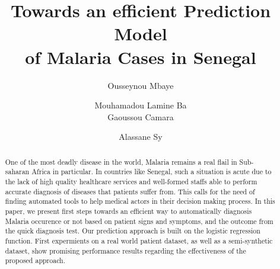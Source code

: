 \documentclass[runningheads]{llncs}
\begin{document}
%
\title{Towards an efficient Prediction Model\\ of Malaria Cases in Senegal}
%
%
\author{Ousseynou Mbaye \and Mouhamadou Lamine Ba \\ Gaoussou Camara \and Alassane Sy}
%
%
%
\maketitle              %
%
\begin{abstract}
One of the most deadly disease in the world, Malaria remains a real flail in Sub-saharan Africa 
in particular. In countries like Senegal, such a situation is acute due to the lack of high quality
healthcare services and well-formed staffs able to perform accurate diagnosis of diseases that patients suffer from. 
This calls for the need of finding automated tools to help medical actors in their decision making process.
In this paper, we present first steps towards an efficient way to automatically diagnosis Malaria occurence or not 
based on patient signs and symptoms, and the outcome from the quick diagnosis test. Our prediction approach is built
on the logistic regression function. First expermients on a real world patient dataset, as well as a semi-synthetic dataset,
show promising performance results regarding the effectiveness of the proposed approach.
 
\end{abstract}
%
%












%
%
%


%
\end{document}
